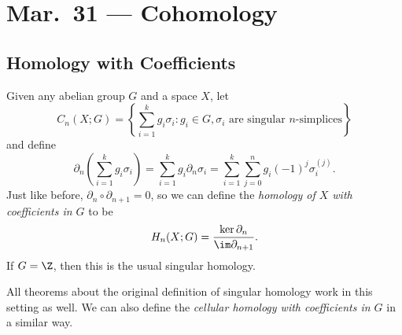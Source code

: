\chapter{Mar.~31 --- Cohomology}

\section{Homology with Coefficients}

\begin{definition}
  Given any abelian group $G$ and a space $X$,
  let
  \[
    C_n(X; G) = \left\{
      \sum_{i = 1}^k g_i \sigma_i :
      g_i \in G, \text{$\sigma_i$ are singular $n$-simplices}
    \right\}
  \]
  and define
  \[
    \partial_n\left(\sum_{i = 1}^k g_i \sigma_i\right)
    = \sum_{i = 1}^k g_i \partial_n \sigma_i
    = \sum_{i = 1}^k \sum_{j = 0}^n g_i (-1)^j \sigma_i^{(j)}.
  \]
  Just like before, $\partial_n \circ \partial_{n + 1} = 0$, so we
  can define the \emph{homology of $X$ with
  coefficients in $G$} to be
  \[
    H_n(X; G) = \frac{\ker \partial_n}{\im \partial_{n + 1}}.
  \]
  If $G = \Z$, then this is the usual singular homology.
\end{definition}

\begin{remark}
  All theorems about the original definition of
  singular homology work in this setting as well.
  We can also define the \emph{cellular homology with coefficients in $G$}
  in a similar way.
\end{remark}

